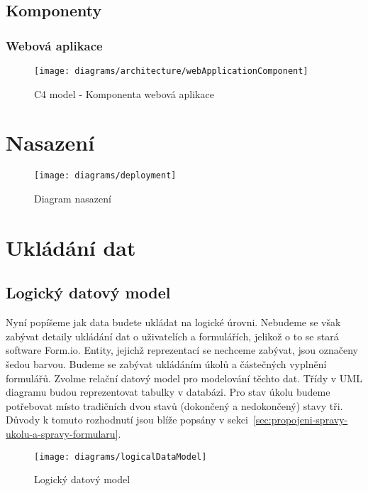 \subsection{Komponenty}\label{subsec:komponenty}

\subsubsection{Webová aplikace}

\begin{figure}[H]
    \texttt{[image: diagrams/architecture/webApplicationComponent]}
    \caption{C4 model - Komponenta webová aplikace}\label{fig:architecture-component-web-application}
\end{figure}


\section{Nasazení}\label{sec:deployment}

\begin{figure}[H]
    \texttt{[image: diagrams/deployment]}
    \caption{Diagram nasazení}\label{fig:deployment}
\end{figure}


\section{Ukládání dat}\label{sec:ukladani-dat}

\subsection{Logický datový model}\label{subsec:logicky-datovy-model}

Nyní popíšeme jak data budete ukládat na logické úrovni.
Nebudeme se však zabývat detaily ukládání dat o uživatelích a formulářích, jelikož o to se stará software Form.io.
Entity, jejichž reprezentací se nechceme zabývat, jsou označeny šedou barvou.
Budeme se zabývat ukládáním úkolů a částečných vyplnění formulářů.
Zvolme relační datový model pro modelování těchto dat.
Třídy v UML diagramu budou reprezentovat tabulky v databázi.
Pro stav úkolu budeme potřebovat místo tradičních dvou stavů (dokončený a nedokončený) stavy tři.
Důvody k tomuto rozhodnutí jsou blíže popsány v sekci\ \ref{sec:propojeni-spravy-ukolu-a-spravy-formularu}.

\begin{figure}[H]
    \texttt{[image: diagrams/logicalDataModel]}
    \caption{Logický datový model}\label{fig:logical-data-model}
\end{figure}

